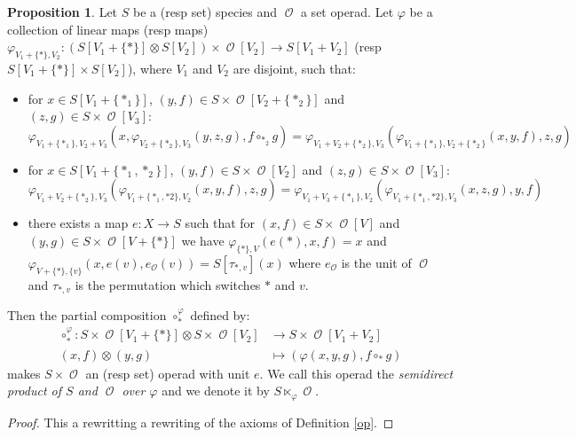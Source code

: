 \documentclass[a4paper]{article}
\DeclareMathOperator{\op}{\mathcal{O}}
\theoremstyle{definition}
\newtheorem{proposition}[definition]{Proposition}
\begin{document}
\begin{proposition}
\label{semiprod}
	Let $S$ be a (resp set) species and $\op$ a set operad. Let $\varphi$ be a
 	collection of linear maps (resp maps) $\varphi_{V_1+\{\ast\},V_2}: 
 	(S[V_1+\{\ast\}]\otimes S[V_2]) \times \op[V_2] \rightarrow S[V_1+V_2]$ (resp
 	$S[V_1+\{\ast\}]\times S[V_2]$),
 	 where $V_1$ and $V_2$ are disjoint, such that: 
	\begin{itemize}
		\item for $x\in S[V_1+\{\ast_1\}]$, $(y,f)\in S\times\op[V_2+\{\ast_2\}]$ 
		and $(z,g)\in S\times\op[V_3]$:
		\begin{equation}
			\varphi_{V_1+\{\ast_1\},V_2+V_3}(x,\varphi_{V_2+\{\ast_2\},V_3}(y,z,g),f\circ_{\ast_2}g) = 
			\varphi_{V_1+V_2+\{\ast_2\},V_3}(\varphi_{V_1+\{\ast_1\},V_2+\{\ast_2\}}(x,y,f),z,g)
		\end{equation}
		\item for $x\in S[V_1+\{\ast_1,\ast_2\}]$, $(y,f)\in S\times\op[V_2]$ 
		and $(z,g)\in S\times\op[V_3]$:
		\begin{equation}
			\varphi_{V_1+V_2+\{\ast_2\},V_3}(\varphi_{V_1+\{\ast_1,\ast2\},V_2}(x,y,f),z,g) = 
			\varphi_{V_1+V_3+\{\ast_1\},V_2}(\varphi_{V_1+\{\ast_1,\ast2\},V_3}(x,z,g),y,f)
		\end{equation}
		\item there exists a map $e:X\rightarrow S$ such that for $(x,f)\in S\times\op[V]$ 
		and $(y,g)\in S\times\op[V+\{\ast\}]$ we have $\varphi_{\{\ast\},V}(e(\ast),x,f) = x$ 
		and $\varphi_{V+\{\ast\}, \{v\}}(x,e(v),e_{\op}(v)) = S[\tau_{\ast,v}](x)$ where 
		$e_{\op}$ is the unit of $\op$ and $\tau_{\ast,v}$ is the permutation which switches $\ast$ and $v$.
	\end{itemize}
	Then the partial composition $\circ^{\varphi}_{\ast}$ defined by:
	\begin{equation}\begin{split}
		\circ^{\varphi}_{\ast}: S\times\op[V_1+\{\ast\}]\otimes S\times\op[V_2] &\rightarrow S\times\op[V_1+V_2] \\
		(x,f)\otimes(y,g) &\mapsto (\varphi(x,y,g),f\circ_{\ast}g)
	\end{split}\end{equation}
	makes $S\times\op$ an (resp set) operad with unit $e$. We call this operad the 
	\textit{semidirect product of $S$ and $\op$ over $\varphi$} and we denote it by $S\ltimes_{\varphi}\op$.
\end{proposition}

\begin{proof}
This a rewritting a rewriting of the axioms of Definition \ref{op}.
\end{proof}
\end{document}
